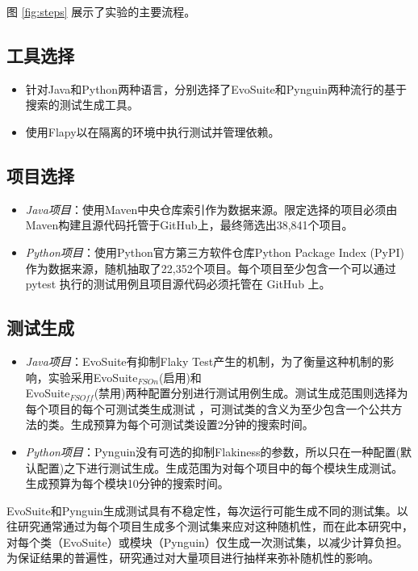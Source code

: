 \documentclass{article}
\newcommand{\flakyTest}{Flaky Test}
\begin{document}
图 \ref{fig:steps} 展示了实验的主要流程。

\subsection{工具选择}

\begin{itemize}
    \item 针对Java和Python两种语言，分别选择了EvoSuite和Pynguin两种流行的基于搜索的测试生成工具。
    \item 使用Flapy以在隔离的环境中执行测试并管理依赖。
\end{itemize}



\subsection{项目选择}

\begin{itemize}
    \item \textit{Java项目}：使用Maven中央仓库索引作为数据来源。限定选择的项目必须由Maven构建且源代码托管于GitHub上，最终筛选出38,841个项目。
    \item \textit{Python项目}：使用Python官方第三方软件仓库Python Package Index (PyPI)作为数据来源，随机抽取了22,352个项目。每个项目至少包含一个可以通过 pytest 执行的测试用例且项目源代码必须托管在 GitHub 上。
\end{itemize}

\subsection{测试生成}

\begin{itemize}
    \item \textit{Java项目}：EvoSuite有抑制\flakyTest 产生的机制，为了衡量这种机制的影响，实验采用EvoSuite${}_{FSOn}$(启用)和 \\
    EvoSuite${}_{FSOff}$(禁用)两种配置分别进行测试用例生成。测试生成范围则选择为每个项目的每个可测试类生成测试 ，可测试类的含义为至少包含一个公共方法的类。生成预算为每个可测试类设置2分钟的搜索时间。
    \item \textit{Python项目}：Pynguin没有可选的抑制Flakiness的参数，所以只在一种配置(默认配置)之下进行测试生成。生成范围为对每个项目中的每个模块生成测试。生成预算为每个模块10分钟的搜索时间。
\end{itemize}

EvoSuite和Pynguin生成测试具有不稳定性，每次运行可能生成不同的测试集。以往研究通常通过为每个项目生成多个测试集来应对这种随机性，而在此本研究中，对每个类（EvoSuite）或模块（Pynguin）仅生成一次测试集，以减少计算负担。为保证结果的普遍性，研究通过对大量项目进行抽样来弥补随机性的影响。
\end{document}
